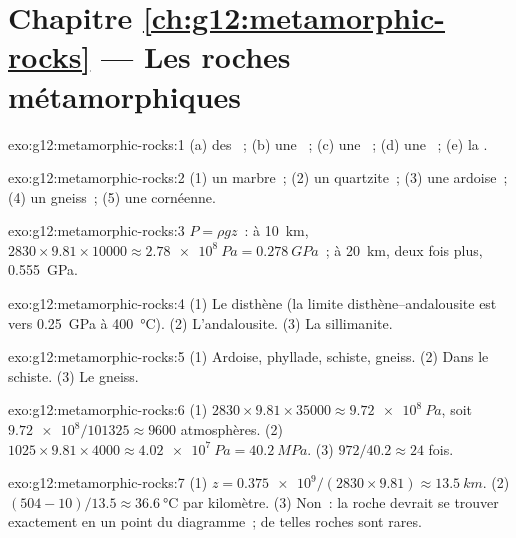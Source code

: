 \section*{Chapitre \ref{ch:g12:metamorphic-rocks} --- Les roches métamorphiques}

\begin{solution}{exo:g12:metamorphic-rocks:1}
(a) des ~; (b) une ~; (c) une ~; (d) une
~; (e) la .
\end{solution}

\begin{solution}{exo:g12:metamorphic-rocks:2}
(1) un marbre~; (2) un quartzite~; (3) une ardoise~; (4) un gneiss~; (5) une
cornéenne.
\end{solution}

\begin{solution}{exo:g12:metamorphic-rocks:3}
$P = \rho g z$~: à \qty{10}{km}, $2830 \times 9.81 \times \num{10000} \approx
\qty{2.78e8}{Pa} = \qty{0.278}{GPa}$~; à \qty{20}{km}, deux fois plus,
\qty{0.555}{GPa}.
\end{solution}

\begin{solution}{exo:g12:metamorphic-rocks:4}
(1) Le disthène (la limite disthène--andalousite est vers
\qty{0.25}{GPa} à \qty{400}{\celsius}). (2) L'andalousite. (3) La
sillimanite.
\end{solution}

\begin{solution}{exo:g12:metamorphic-rocks:5}
(1) Ardoise, phyllade, schiste, gneiss. (2) Dans le schiste. (3) Le gneiss.
\end{solution}

\begin{solution}{exo:g12:metamorphic-rocks:6}
(1) $2830 \times 9.81 \times \num{35000} \approx \qty{9.72e8}{Pa}$, soit
$\num{9.72e8}/101325 \approx \num{9600}$ atmosphères. (2) $1025 \times 9.81
\times 4000 \approx \qty{4.02e7}{Pa} = \qty{40.2}{MPa}$. (3) $972/40.2
\approx 24$ fois.
\end{solution}

\begin{solution}{exo:g12:metamorphic-rocks:7}
(1) $z = \num{0.375e9}/(2830 \times 9.81) \approx \qty{13.5}{km}$.
(2) $(504 - 10)/13.5 \approx \qty{36.6}{\celsius}$ par kilomètre. (3) Non~:
la roche devrait se trouver exactement en un point du diagramme~; de telles
roches sont rares.
\end{solution}

